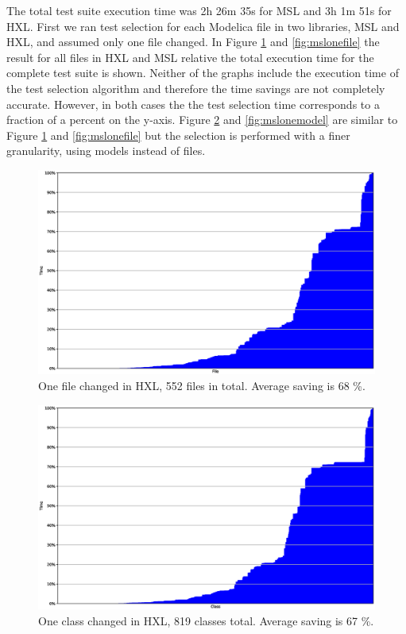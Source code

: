 \documentclass{cslthse-msc}
\begin{document}
The total test suite execution time was 2h 26m 35s for MSL and 3h 1m 51s for HXL. First we ran test selection for each Modelica file in two libraries, MSL and HXL, and assumed only one file changed. In Figure \ref{fig:hxlonefile} and \ref{fig:mslonefile} the result for all files in HXL and MSL relative the total execution time for the complete test suite is shown. Neither of the graphs include the execution time of the test selection algorithm and therefore the time savings are not completely accurate. However, in both cases the the test selection time corresponds to a fraction of a percent on the y-axis. Figure \ref{fig:hxlonemodel} and \ref{fig:mslonemodel} are similar to Figure \ref{fig:hxlonefile} and \ref{fig:mslonefile} but the selection is performed with a finer granularity, using models instead of files. 

\begin{figure}[!htbp]
    \centering
    \includegraphics[width=\textwidth]{Graphs/HXL_one_file.eps}
    \caption{One file changed in HXL, 552 files in total. Average saving is 68 \%.}
    \label{fig:hxlonefile}
\end{figure}

\begin{figure}[!htbp]
    \centering
    \includegraphics[width=\textwidth]{Graphs/HXL_one_model.eps}
    \caption{One class changed in HXL, 819 classes total. Average saving is 67 \%.}
    \label{fig:hxlonemodel}
\end{figure}
\end{document}
